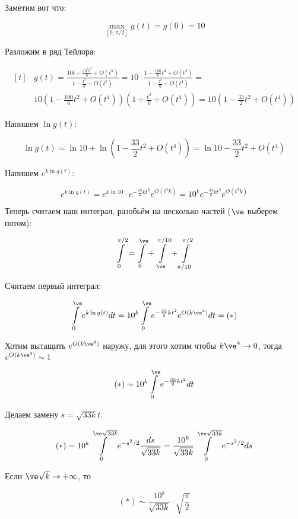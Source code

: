 \begin{example}
    Заметим вот что:

    \[
        \max_{[0, \pi/2]} g(t) = g(0) = 10
    \]

    Разложим в ряд Тейлора:

    \[
        \begin{aligned}[t]
             & g(t) = \frac{10t-\frac{10^3t^3}{6} + O(t^5)}
            {t-\frac{t^3}{6}+O(t^5)} = 10 \cdot
            \frac{1-\frac{100}{6}t^2 + O(t^4)}{1-\frac{t^2}{6}+O(t^4)}
            =                                               \\ & 10\left(1-\frac{100}{6}t^2 + O(t^4)\right)
            \left(1 + \frac{t^2}{6} + O(t^4)\right)
            = 10 \left(1-\frac{33}{2}t^2 + O(t^4)\right)
        \end{aligned}
    \]

    Напишем $\ln g(t)$:

    \[
        \ln g(t) = \ln 10 + \ln \left(1 - \frac{33}{2}t^2
        + O(t^4)\right)
        = \ln 10 - \frac{33}{2}t^2 + O(t^4)
    \]

    Напишем $e^{k\ln g(t)}$:

    \[
        e^{k\ln g(t)} = e^{k\ln 10}\cdot e^{-\frac{33}{2}kt^2}
        e^{O(t^4k)} = 10^k e^{-\frac{33}{2}kt^2} e^{O(t^4k)}
    \]

    Теперь считаем наш интеграл, разобьём на несколько частей
    ($\ve$ выберем потом):

    \[
        \int\limits_0^{\pi/2} =
        \int\limits_0^{\ve} + \int\limits_{\ve}^{\pi/10} + \int\limits_{\pi/10}^{\pi/2}
    \]

    Считаем первый интеграл:

    \[
        \int\limits_0^\ve e^{k\ln g(t)} dt =
        10^k \int\limits_0^\ve e^{-\frac{33}{2}kt^2} e^{O(k\ve^4)} dt = (*)
    \]

    Хотим вытащить $e^{O(k\ve^4)}$ наружу, для этого хотим чтобы
    $k\ve^4 \to 0$, тогда $e^{O(k\ve^4)} \sim 1$

    \[
        (*) \sim 10^k \int\limits_0^\ve e^{-\frac{33}{2}kt^2} dt
    \]

    Делаем замену $s = \sqrt{33k}t$.

    \[
        (*) = 10^k \int\limits_{0}^{\ve \sqrt{33k}}
        e^{-s^2/2} \frac{ds}{\sqrt{33k}}
        = \frac{10^k}{\sqrt{33k}}
        \int\limits_{0}^{\ve \sqrt{33k}}
        e^{-s^2/2} ds
    \]

    Если $\ve\sqrt{k} \to +\infty$, то

    \[
        (*) \sim \frac{10^k}{\sqrt{33k}} \cdot \sqrt{\frac{\pi}{2}}
    \]


\end{example}
